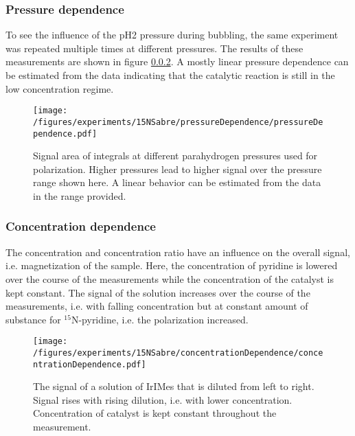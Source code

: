     \subsubsection{Pressure dependence}
        To see the influence of the pH2 pressure during bubbling, the same experiment was repeated multiple times at different pressures. The results of these measurements are shown in figure \ref{}. A mostly linear pressure dependence can be estimated from the data indicating that the catalytic reaction is still in the low concentration regime.
        \begin{figure}
            \label{fig:results:15N:pressureDependence}
            \texttt{[image: /figures/experiments/15NSabre/pressureDependence/pressureDependence.pdf]}
            \caption{Signal area of integrals at different parahydrogen pressures used for polarization. Higher pressures lead to higher signal over the pressure range shown here. A linear behavior can be estimated from the data in the range provided.}
        \end{figure}
    \subsubsection{Concentration dependence}
        The concentration and concentration ratio have an influence on the overall signal, i.e. magnetization of the sample. Here, the concentration of pyridine is lowered over the course of the measurements while the concentration of the catalyst is kept constant. The signal of the solution increases over the course of the measurements, i.e. with falling concentration but at constant amount of substance for $^{15}$N-pyridine, i.e. the polarization increased.
        \begin{figure}
            \label{fig:results:15N:concentrationDependence}
            \texttt{[image: /figures/experiments/15NSabre/concentrationDependence/concentrationDependence.pdf]}
            \caption{The signal of a solution of IrIMes that is diluted from left to right. Signal rises with rising dilution, i.e. with lower concentration. Concentration of catalyst is kept constant throughout the measurement.}
        \end{figure}

